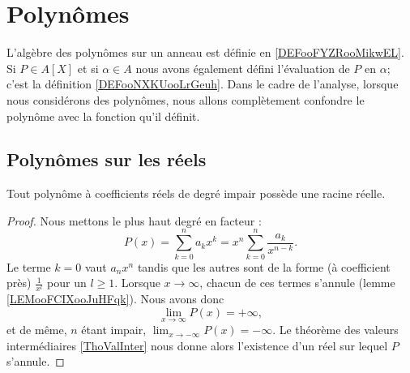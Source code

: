 \section{Polynômes}

L'algèbre des polynômes sur un anneau est définie en \ref{DEFooFYZRooMikwEL}. Si \( P\in A[X]\) et si \( \alpha\in A\) nous avons également défini l'évaluation de \( P\) en \( \alpha\); c'est la définition \ref{DEFooNXKUooLrGeuh}. Dans le cadre de l'analyse, lorsque nous considérons des polynômes, nous allons complètement confondre le polynôme avec la fonction qu'il définit.

\subsection{Polynômes sur les réels}

\begin{proposition}     \label{PROPooJKYJooFqbQMr}
    Tout polynôme à coefficients réels de degré impair possède une racine réelle.
\end{proposition}

\begin{proof}
    Nous mettons le plus haut degré en facteur :
    \begin{equation}
        P(x)=\sum_{k=0}^na_kx^k=x^n\sum_{k=0}^n\frac{ a_k }{ x^{n-k} }.
    \end{equation}
    Le terme \( k=0\) vaut \( a_nx^n\) tandis que les autres sont de la forme (à coefficient près) \( \frac{1}{ x^l }\) pour un \( l\geq 1\). Lorsque \( x\to \infty\), chacun de ces termes s'annule (lemme \ref{LEMooFCIXooJuHFqk}). Nous avons donc
    \begin{equation}
        \lim_{x\to \infty} P(x)=+\infty,
    \end{equation}
    et de même, \( n\) étant impair, \( \lim_{x\to -\infty} P(x)=-\infty\). Le théorème des valeurs intermédiaires \ref{ThoValInter} nous donne alors l'existence d'un réel sur lequel \( P\) s'annule.
\end{proof}

